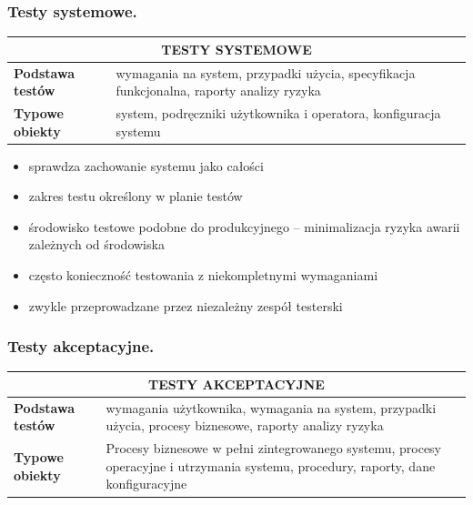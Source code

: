 \documentclass[12pt]{article}
\begin{document}
    \subsubsection{Testy systemowe.}

    \begin{table}[H]
        \begin{center}
            \begin{tabular}{| p{4cm}| p{12cm}|}
                \hline
                \multicolumn{2}{|c|}{ \textbf{TESTY SYSTEMOWE}}\\
                \hline
                \textbf{Podstawa testów} & wymagania na system, przypadki użycia,
                specyfikacja funkcjonalna, raporty analizy ryzyka\\
                \hline
                \textbf{Typowe obiekty} & system, podręczniki użytkownika i operatora,
                konfiguracja systemu\\
                \hline
            \end{tabular}
        \end{center}
    \end{table}

    \begin{itemize}
        \item sprawdza zachowanie systemu jako całości
        \item zakres testu określony w planie testów
        \item środowisko testowe podobne do produkcyjnego – minimalizacja ryzyka awarii zależnych od środowiska
        \item często konieczność testowania z niekompletnymi wymaganiami
        \item zwykle przeprowadzane przez niezależny zespół testerski
    \end{itemize}

    \subsubsection{Testy akceptacyjne.}

    \begin{table}[H]
        \begin{center}
            \begin{tabular}{| p{4cm}| p{12cm}|}
                \hline
                \multicolumn{2}{|c|}{ \textbf{TESTY AKCEPTACYJNE}}\\
                \hline
                \textbf{Podstawa testów} & wymagania użytkownika, wymagania na system,
                przypadki użycia, procesy biznesowe, raporty
                analizy ryzyka\\
                \hline
                \textbf{Typowe obiekty} & Procesy biznesowe w pełni zintegrowanego
                systemu, procesy operacyjne i utrzymania systemu,
                procedury, raporty, dane konfiguracyjne\\
                \hline
            \end{tabular}
        \end{center}
    \end{table}
\end{document}
